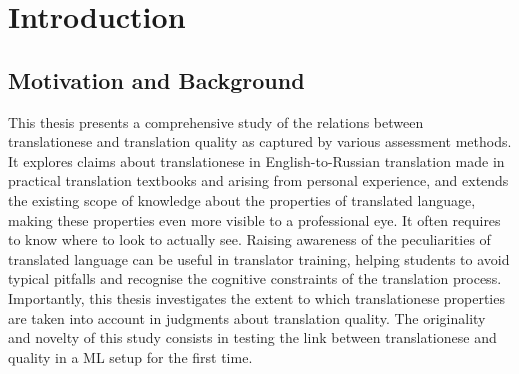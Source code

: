 \chapter{\label{cha:intro}Introduction}
%

\section{\label{sec:motivation}Motivation and Background}

This thesis presents a comprehensive study of the relations between translationese and translation quality as captured by various assessment methods. 
It explores claims about translationese in English-to-Russian translation made in practical translation textbooks and arising from personal experience, and extends the existing scope of knowledge about the properties of translated language, making these properties even more visible to a professional eye. It often requires to know where to look to actually see. Raising awareness of the peculiarities of translated language can be useful in translator training, helping students to avoid typical pitfalls and recognise the cognitive constraints of the translation process. Importantly, this thesis investigates the extent to which translationese properties are taken into account in judgments about translation quality.
The originality and novelty of this study consists in testing the link between translationese and quality in a ML setup for the first time. 

